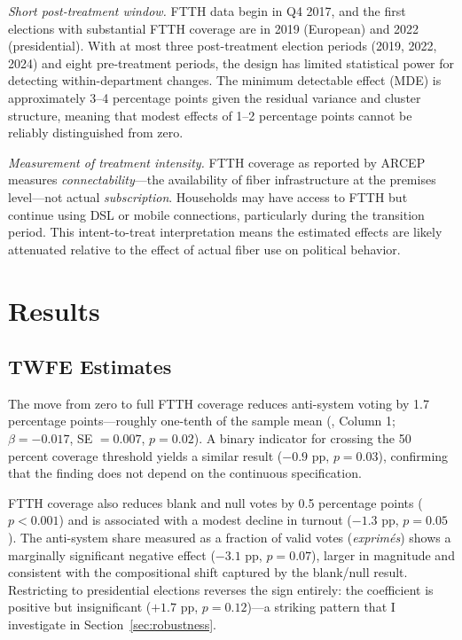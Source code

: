 \documentclass[12pt]{article}
\begin{document}
\emph{Short post-treatment window.} FTTH data begin in Q4 2017, and the first elections with substantial FTTH coverage are in 2019 (European) and 2022 (presidential). With at most three post-treatment election periods (2019, 2022, 2024) and eight pre-treatment periods, the design has limited statistical power for detecting within-department changes. The minimum detectable effect (MDE) is approximately 3--4 percentage points given the residual variance and cluster structure, meaning that modest effects of 1--2 percentage points cannot be reliably distinguished from zero.

\emph{Measurement of treatment intensity.} FTTH coverage as reported by ARCEP measures \emph{connectability}---the availability of fiber infrastructure at the premises level---not actual \emph{subscription}. Households may have access to FTTH but continue using DSL or mobile connections, particularly during the transition period. This intent-to-treat interpretation means the estimated effects are likely attenuated relative to the effect of actual fiber use on political behavior.



\section{Results}\label{sec:results}

\subsection{TWFE Estimates}

The move from zero to full FTTH coverage reduces anti-system voting by 1.7 percentage points---roughly one-tenth of the sample mean (, Column 1; $\beta = -0.017$, SE $= 0.007$, $p = 0.02$). A binary indicator for crossing the 50 percent coverage threshold yields a similar result ($-0.9$ pp, $p = 0.03$), confirming that the finding does not depend on the continuous specification.

FTTH coverage also reduces blank and null votes by 0.5 percentage points ($p < 0.001$) and is associated with a modest decline in turnout ($-1.3$ pp, $p = 0.05$). The anti-system share measured as a fraction of valid votes (\emph{exprim\'es}) shows a marginally significant negative effect ($-3.1$ pp, $p = 0.07$), larger in magnitude and consistent with the compositional shift captured by the blank/null result. Restricting to presidential elections reverses the sign entirely: the coefficient is positive but insignificant ($+1.7$ pp, $p = 0.12$)---a striking pattern that I investigate in Section~\ref{sec:robustness}.
\end{document}
